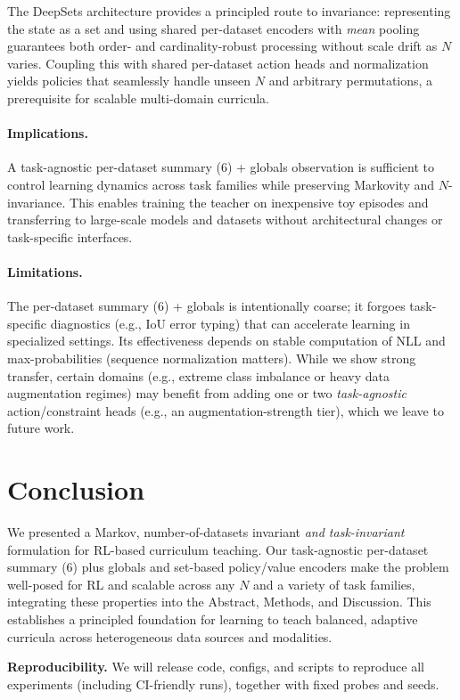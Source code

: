 \documentclass[11pt]{article}
\newcommand{\1}{\mathbf{1}}
\begin{document}
The DeepSets architecture provides a principled route to invariance: representing the state as a set and using shared per-dataset encoders with \emph{mean} pooling guarantees both order- and cardinality-robust processing without scale drift as $N$ varies.
Coupling this with shared per-dataset action heads and normalization yields policies that seamlessly handle unseen $N$ and arbitrary permutations, a prerequisite for scalable multi-domain curricula.

\paragraph{Implications.}
A task-agnostic per-dataset summary (6) + globals observation is sufficient to control learning dynamics across task families while preserving Markovity and $N$-invariance. 
This enables training the teacher on inexpensive toy episodes and transferring to large-scale models and datasets without architectural changes or task-specific interfaces.

\paragraph{Limitations.}
The per-dataset summary (6) + globals is intentionally coarse; it forgoes task-specific diagnostics (e.g., IoU error typing) that can accelerate learning in specialized settings. 
Its effectiveness depends on stable computation of NLL and max-probabilities (sequence normalization matters). 
While we show strong transfer, certain domains (e.g., extreme class imbalance or heavy data augmentation regimes) may benefit from adding one or two \emph{task-agnostic} action/constraint heads (e.g., an augmentation-strength tier), which we leave to future work.

\section{Conclusion}
We presented a Markov, number-of-datasets invariant \emph{and task-invariant} formulation for RL-based curriculum teaching.
Our task-agnostic per-dataset summary (6) plus globals and set-based policy/value encoders make the problem well-posed for RL and scalable across any $N$ and a variety of task families, integrating these properties into the Abstract, Methods, and Discussion.
This establishes a principled foundation for learning to teach balanced, adaptive curricula across heterogeneous data sources and modalities.

\medskip
\noindent\textbf{Reproducibility.}
We will release code, configs, and scripts to reproduce all experiments (including CI-friendly runs), together with fixed probes and seeds.
\end{document}

